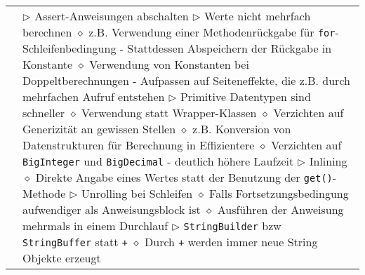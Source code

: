 \begin{longtable}{ | p{} p{} | }
	\makecell[l]{Laufzeitverbesserungen} & \makecell[l]{
	$\rhd$ Assert-Anweisungen abschalten \\
	$\rhd$ Werte nicht mehrfach berechnen \\
	\hspace{0.4cm} $\diamond$ z.B. Verwendung einer Methodenrückgabe für \texttt{for}-Schleifenbedingung \\
	\hspace{0.6cm} - Stattdessen Abspeichern der Rückgabe in Konstante \\
	\hspace{0.4cm} $\diamond$ Verwendung von Konstanten bei Doppeltberechnungen \\
	\hspace{0.6cm} - Aufpassen auf Seiteneffekte, die z.B. durch mehrfachen Aufruf entstehen \\
	$\rhd$ Primitive Datentypen sind schneller \\
	\hspace{0.4cm} $\diamond$ Verwendung statt Wrapper-Klassen \\
	\hspace{0.4cm} $\diamond$ Verzichten auf Generizität an gewissen Stellen \\
	\hspace{0.4cm} $\diamond$ z.B. Konversion von Datenstrukturen für Berechnung in Effizientere  \\
	\hspace{0.4cm} $\diamond$ Verzichten auf \texttt{BigInteger} und \texttt{BigDecimal} \\
	\hspace{0.6cm} - deutlich höhere Laufzeit \\
	$\rhd$ Inlining \\
	\hspace{0.4cm} $\diamond$ Direkte Angabe eines Wertes statt der Benutzung der \texttt{get()}-Methode \\
	$\rhd$ Unrolling bei Schleifen \\
	\hspace{0.4cm} $\diamond$ Falls Fortsetzungsbedingung aufwendiger als Anweisungsblock ist \\
	\hspace{0.4cm} $\diamond$ Ausführen der Anweisung mehrmals in einem Durchlauf \\
	$\rhd$ \texttt{StringBuilder} bzw \texttt{StringBuffer} statt \texttt{+} \\
	\hspace{0.4cm} $\diamond$ Durch \texttt{+} werden immer neue String Objekte erzeugt \\
}
\end{longtable}

